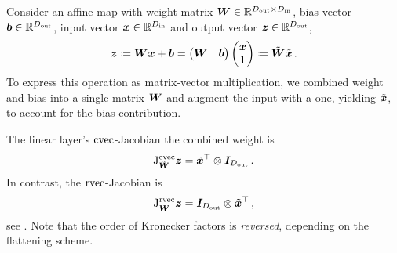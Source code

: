 \switchcolumn[1]
\begin{example}\label{ex:linear_layer_jacobians}
  Consider an affine map with weight matrix ${\bm{W}} \in {\mathbb{R}}^{D_{\text{out}} \times D_{\text{in}}}$, bias vector ${\bm{b}} \in {\mathbb{R}}^{D_{\text{out}}}$, input vector ${\bm{x}} \in {\mathbb{R}}^{D_{\text{in}}}$ and output vector ${\bm{z}} \in {\mathbb{R}}^{D_{\text{out}}}$,
  \begin{align*}
    {\bm{z}}
    \coloneqq
    {\bm{W}} {\bm{x}} + {\bm{b}}
    =
    \begin{pmatrix}
      {\bm{W}} & {\bm{b}}
    \end{pmatrix}
    \begin{pmatrix}
      {\bm{x}} \\ 1
    \end{pmatrix}
    \coloneqq
    \tilde{{\bm{W}}}
    \tilde{{\bm{x}}}\,.
  \end{align*}
  To express this operation as matrix-vector multiplication, we combined weight and bias into a single matrix $\tilde{{\bm{W}}}$ and augment the input with a one, yielding $\tilde{{\bm{x}}}$, to account for the bias contribution.

  The linear layer's $\operatorname{cvec}$-Jacobian \wrt the combined weight is
  \begin{align*}
    \mathrm{J}^{\operatorname{cvec}}_{\tilde{{\bm{W}}}}{\bm{z}}
    =
    \tilde{{\bm{x}}}^{\top}
    \otimes
    {\bm{I}}_{D_{\text{out}}}\,.
  \end{align*}
  In contrast, the $\operatorname{rvec}$-Jacobian is
  \begin{align*}
    \mathrm{J}^{\operatorname{rvec}}_{\tilde{{\bm{W}}}}{\bm{z}}
    =
    {\bm{I}}_{D_{\text{out}}}
    \otimes
    \tilde{{\bm{x}}}^{\top}\,,
  \end{align*}
  see .
  Note that the order of Kronecker factors is \emph{reversed}, depending on the flattening scheme.
\end{example}
\switchcolumn[0]

\switchcolumn[1]
\switchcolumn[0]


